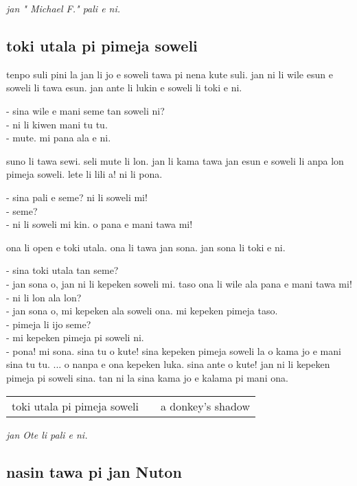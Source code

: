 \textit{jan " Michael F."   pali e ni. \cite{www:failbluedot:01}}
%
\subsection{toki utala pi pimeja soweli}

tenpo suli pini la jan li jo e soweli tawa pi nena kute suli.
jan ni li wile esun e soweli li tawa esun.
jan ante li lukin e soweli li toki e ni.

- sina wile e mani seme tan soweli ni? \\
- ni li kiwen mani tu tu. \\
- mute. mi pana ala e ni.

suno li tawa sewi.
seli mute li lon.
jan li kama tawa jan esun e soweli li anpa lon pimeja soweli.
lete li lili a!
ni li pona.

- sina pali e seme? ni li soweli mi! \\
- seme?          \\
- ni li soweli mi kin. o pana e mani tawa mi!

ona li open e toki utala. ona li tawa jan sona. jan sona li toki e ni.

- sina toki utala tan seme? \\
- jan sona o, jan ni li kepeken soweli mi. taso ona li wile ala pana e mani tawa mi! \\
- ni li lon ala lon? \\
- jan sona o, mi kepeken ala soweli ona. mi kepeken pimeja taso. \\
- pimeja li ijo seme? \\
- mi kepeken pimeja pi soweli ni. \\
- pona! mi sona. sina tu o kute! sina kepeken pimeja soweli la o kama jo e mani sina tu tu. ...
o nanpa e ona kepeken luka. sina ante o kute! jan ni li kepeken pimeja pi soweli sina. tan ni la sina kama jo e kalama pi mani ona.

\begin{supertabular}{p{5,5cm}|ll}
    toki utala pi pimeja soweli &  & a donkey's shadow \\
\end{supertabular}

\textit{jan Ote li pali e ni. \cite{www:olukin:01}}
%
\newpage
\subsection{nasin tawa pi jan Nuton}

